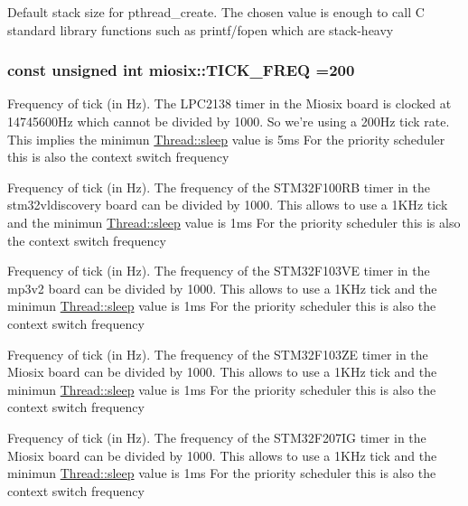 Default stack size for pthread\-\_\-create. The chosen value is enough to call C standard library functions such as printf/fopen which are stack-\/heavy \hypertarget{group___settings_ga81e4cfce99dd185b6ada00ead4f39342}{
\subsubsection[{T\-I\-C\-K\-\_\-\-F\-R\-E\-Q}]{\setlength{\rightskip}{0pt plus 5cm}const unsigned int miosix\-::\-T\-I\-C\-K\-\_\-\-F\-R\-E\-Q =200}}\label{group___settings_ga81e4cfce99dd185b6ada00ead4f39342}
Frequency of tick (in Hz). The L\-P\-C2138 timer in the Miosix board is clocked at 14745600\-Hz which cannot be divided by 1000. So we're using a 200\-Hz tick rate. This implies the minimun \hyperlink{classmiosix_1_1_thread_ad7f738dc69a918960fe814a062696c5c}{Thread\-::sleep} value is 5ms For the priority scheduler this is also the context switch frequency

Frequency of tick (in Hz). The frequency of the S\-T\-M32\-F100\-R\-B timer in the stm32vldiscovery board can be divided by 1000. This allows to use a 1\-K\-Hz tick and the minimun \hyperlink{classmiosix_1_1_thread_ad7f738dc69a918960fe814a062696c5c}{Thread\-::sleep} value is 1ms For the priority scheduler this is also the context switch frequency

Frequency of tick (in Hz). The frequency of the S\-T\-M32\-F103\-V\-E timer in the mp3v2 board can be divided by 1000. This allows to use a 1\-K\-Hz tick and the minimun \hyperlink{classmiosix_1_1_thread_ad7f738dc69a918960fe814a062696c5c}{Thread\-::sleep} value is 1ms For the priority scheduler this is also the context switch frequency

Frequency of tick (in Hz). The frequency of the S\-T\-M32\-F103\-Z\-E timer in the Miosix board can be divided by 1000. This allows to use a 1\-K\-Hz tick and the minimun \hyperlink{classmiosix_1_1_thread_ad7f738dc69a918960fe814a062696c5c}{Thread\-::sleep} value is 1ms For the priority scheduler this is also the context switch frequency

Frequency of tick (in Hz). The frequency of the S\-T\-M32\-F207\-I\-G timer in the Miosix board can be divided by 1000. This allows to use a 1\-K\-Hz tick and the minimun \hyperlink{classmiosix_1_1_thread_ad7f738dc69a918960fe814a062696c5c}{Thread\-::sleep} value is 1ms For the priority scheduler this is also the context switch frequency

